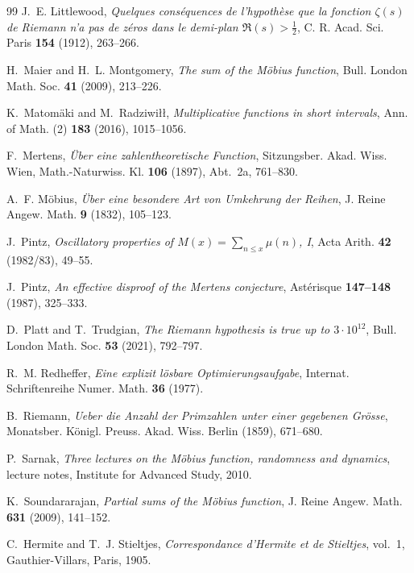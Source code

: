 \documentclass[11pt]{amsart}
\numberwithin{equation}{section}
\theoremstyle{plain}
\theoremstyle{definition}
\theoremstyle{remark}
\begin{document}
\begin{thebibliography}{99}
J.~E. Littlewood, \emph{Quelques cons\'equences de l'hypoth\`ese que la
fonction $\zeta(s)$ de Riemann n'a pas de z\'eros dans le demi-plan
$\Re(s)>\frac12$}, C. R. Acad. Sci. Paris \textbf{154} (1912), 263--266.

H.~Maier and H.~L. Montgomery, \emph{The sum of the M\"obius function},
Bull. London Math. Soc. \textbf{41} (2009), 213--226.

K.~Matom\"aki and M.~Radziwi\l\l, \emph{Multiplicative functions in short
intervals}, Ann. of Math. (2) \textbf{183} (2016), 1015--1056.

F.~Mertens, \emph{\"Uber eine zahlentheoretische Function}, Sitzungsber.
Akad. Wiss. Wien, Math.-Naturwiss. Kl. \textbf{106} (1897), Abt.~2a,
761--830.

A.~F. M\"obius, \emph{\"Uber eine besondere Art von Umkehrung der Reihen},
J. Reine Angew. Math. \textbf{9} (1832), 105--123.

J.~Pintz, \emph{Oscillatory properties of $M(x)=\sum_{n\le x}\mu(n)$, I},
Acta Arith. \textbf{42} (1982/83), 49--55.

J.~Pintz, \emph{An effective disproof of the Mertens conjecture}, Ast\'erisque
\textbf{147--148} (1987), 325--333.

D.~Platt and T.~Trudgian, \emph{The Riemann hypothesis is true up to
$3\cdot10^{12}$}, Bull. London Math. Soc. \textbf{53} (2021), 792--797.

R.~M. Redheffer, \emph{Eine explizit l\"osbare Optimierungsaufgabe}, Internat.
Schriftenreihe Numer. Math. \textbf{36} (1977).

B.~Riemann, \emph{Ueber die Anzahl der Primzahlen unter einer gegebenen
Gr\"osse}, Monatsber. K\"onigl. Preuss. Akad. Wiss. Berlin (1859), 671--680.

P.~Sarnak, \emph{Three lectures on the M\"obius function, randomness and
dynamics}, lecture notes, Institute for Advanced Study, 2010.

K.~Soundararajan, \emph{Partial sums of the M\"obius function}, J. Reine
Angew. Math. \textbf{631} (2009), 141--152.

C.~Hermite and T.~J. Stieltjes, \emph{Correspondance d'Hermite et de
Stieltjes}, vol.~1, Gauthier-Villars, Paris, 1905.


\end{thebibliography}
\end{document}
